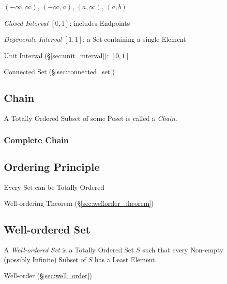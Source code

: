 $(-\infty, \infty)$, $(-\infty,a)$, $(a,\infty)$, $(a,b)$

\emph{Closed Interval} $[0,1]$: includes Endpoints

\emph{Degenerate Interval} $[1,1]$: a Set containing a single Element

Unit Interval (\S\ref{sec:unit_interval}): $[0,1]$

Connected Set (\S\ref{sec:connected_set})



\subsection{Chain}\label{sec:chain}

A Totally Ordered Subset of some Poset is called a \emph{Chain}.



\subsubsection{Complete Chain}\label{sec:complete_chain}



\subsection{Ordering Principle}\label{sec:ordering_principle}

Every Set can be Totally Ordered

Well-ordering Theorem (\S\ref{sec:wellorder_theorem})



\subsection{Well-ordered Set}\label{sec:wellordered_set}

A \emph{Well-ordered Set} is a Totally Ordered Set $S$ such that every
Non-empty (possibly Infinite) Subset of $S$ has a Least Element.

Well-order (\S\ref{sec:well_order})

